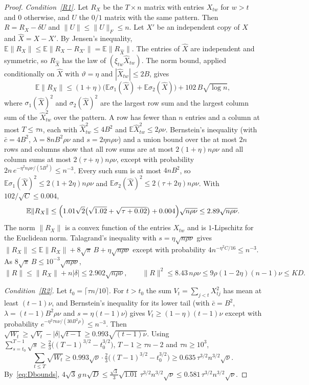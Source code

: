 \documentclass[11pt,a4paper]{article}
\theoremstyle{definition}
\theoremstyle{remark}
\newcommand{\E}{\mathbb E}
\begin{document}
\begin{proof}
\emph{Condition~\eqref{R1}.} Let $R_X$ be the $T\times n$ matrix with entries
$X_{tw}$ for $w>t$ and $0$ otherwise, and $U$ the $0/1$ matrix with the same
pattern. Then $R=R_X-\delta U$ and $\|U\|\le\|U\|_F\le n$. Let $X'$ be an
independent copy of $X$ and $\hat X=X-X'$. By Jensen's inequality,
$\E\|R_X\|\le\E\|R_X-R_{X'}\|=\E\|R_{\hat X}\|$. The entries of $\hat X$ are
independent and symmetric, so $R_{\hat X}$ has the law of
$(\xi_{tw}\hat X_{tw})$. The norm bound, applied conditionally on $\hat X$ with
$\vartheta=\eta$ and $|\hat X_{tw}|\le2B$, gives
\[
 \E\|R_X\|\le(1+\eta)\bigl(\E\sigma_1(\hat X)+\E\sigma_2(\hat X)\bigr)
 +102\,B\sqrt{\log n},
\]
where $\sigma_1(\hat X)^2$ and $\sigma_2(\hat X)^2$ are the largest row sum and
the largest column sum of the $\hat X_{tw}^2$ over the pattern. A row has fewer
than $n$ entries and a column at most $T\le\tau n$, each with
$\hat X_{tw}^2\le4B^2$ and $\E\hat X_{tw}^2\le2\rho\nu$. Bernstein's inequality
(with $\bar c=4B^2$, $\lambda=8nB^2\rho\nu$ and $s=2\eta n\rho\nu$) and a union
bound over the at most $2n$ rows and columns show that all row sums are at most
$2(1+\eta)n\rho\nu$ and all column sums at most $2(\tau+\eta)n\rho\nu$, except
with probability $2n\,e^{-\eta^2n\rho\nu/(5B^2)}\le n^{-3}$. Every such sum is
at most $4nB^2$, so $\E\sigma_1(\hat X)^2\le2(1+2\eta)n\rho\nu$ and
$\E\sigma_2(\hat X)^2\le2(\tau+2\eta)n\rho\nu$. With $102/\sqrt C\le0.004$,
\[
 \E\|R_X\|\le\Bigl(1.01\sqrt2\bigl(\sqrt{1.02}+\sqrt{\tau+0.02}\bigr)
 +0.004\Bigr)\sqrt{n\rho\nu}\le2.89\sqrt{n\rho\nu}.
\]
The norm $\|R_X\|$ is a convex function of the entries $X_{tw}$ and is
$1$-Lipschitz for the Euclidean norm. Talagrand's inequality with
$s=\eta\sqrt{n\rho\nu}$ gives
$\|R_X\|\le\E\|R_X\|+8\sqrt\pi\,B+\eta\sqrt{n\rho\nu}$ except with probability
$4n^{-\eta^2C/16}\le n^{-3}$. As $8\sqrt\pi\,B\le10^{-3}\sqrt{n\rho\nu}$,
\[
 \|R\|\le\|R_X\|+n|\delta|\le2.902\sqrt{n\rho\nu},\qquad
 \|R\|^2\le8.43\,n\rho\nu\le9\rho(1-2\eta)(n-1)\nu\le KD .
\]

\emph{Condition~\eqref{R2}.} Let $t_0=\lceil\tau n/10\rceil$. For $t>t_0$ the
sum $V_t=\sum_{j<t}X_{tj}^2$ has mean at least $(t-1)\nu$, and Bernstein's
inequality for its lower tail (with $\bar c=B^2$, $\lambda=(t-1)B^2\rho\nu$ and
$s=\eta(t-1)\nu$) gives $V_t\ge(1-\eta)(t-1)\nu$ except with probability
$e^{-\eta^2\tau n\nu/(30B^2\rho)}\le n^{-3}$. Then
$\sqrt{W_t}\ge\sqrt{V_t}-|\delta|\sqrt{t-1}\ge0.993\sqrt{(t-1)\nu}$. Using
$\sum_{s=t_0}^{T-1}\sqrt s\ge\frac23\bigl((T-1)^{3/2}-t_0^{3/2}\bigr)$,
$T-1\ge\tau n-2$ and $\tau n\ge10^3$,
\[
 \sum_{t\le T}\sqrt{W_t}\ge0.993\sqrt\nu\cdot\tfrac23\bigl((T-1)^{3/2}
 -t_0^{3/2}\bigr)\ge0.635\,\tau^{3/2}n^{3/2}\sqrt\nu .
\]
By~\eqref{eq:Dbounds},
$4\sqrt3\,g\,n\sqrt D\le\frac{\sqrt3}3\sqrt{1.01}\,\tau^{3/2}n^{3/2}\sqrt\nu
\le0.581\,\tau^{3/2}n^{3/2}\sqrt\nu$.


\end{proof}
\end{document}
